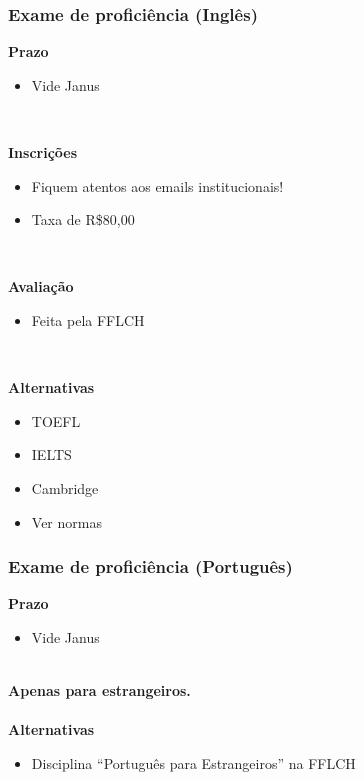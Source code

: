 \documentclass{beamer}
\begin{document}
\begin{frame}
  \frametitle{Exame de proficiência (Inglês)}

  \textbf{Prazo}
  \begin{itemize}
    \item Vide Janus
  \end{itemize}~\\\pause

  \textbf{Inscrições}
  \begin{itemize}
    \item Fiquem atentos aos emails institucionais!
    \item Taxa de R\$80,00
  \end{itemize}~\\\pause

  \textbf{Avaliação}
  \begin{itemize}
    \item Feita pela FFLCH
  \end{itemize}~\\\pause

  \textbf{Alternativas}
  \begin{multicols}{2}
  \begin{itemize}
    \item TOEFL
    \item IELTS\columnbreak
    \item Cambridge
    \item Ver normas
  \end{itemize}
  \end{multicols}
\end{frame}

\begin{frame}
  \frametitle{Exame de proficiência (Português)}

  \textbf{Prazo}
  \begin{itemize}
    \item Vide Janus
  \end{itemize}~\\

  \textbf{Apenas para estrangeiros.}\\~\\

  \textbf{Alternativas}
  \begin{itemize}
    \item Disciplina ``Português para Estrangeiros'' na FFLCH
  \end{itemize}
\end{frame}
\end{document}
